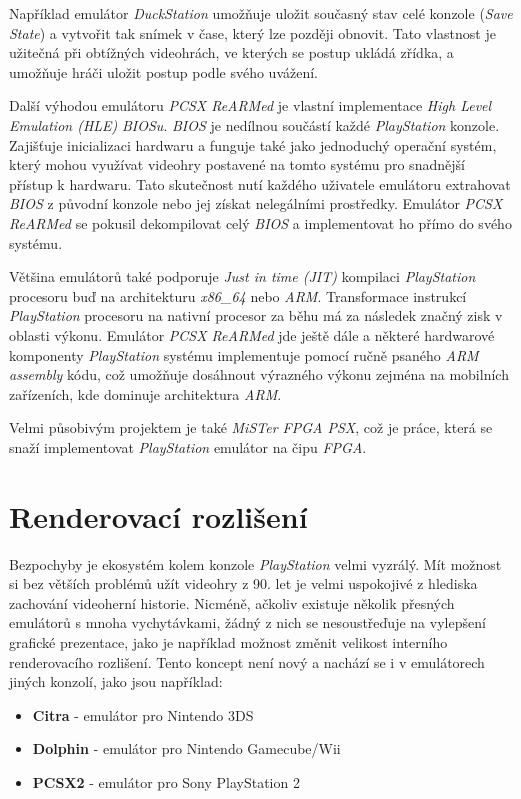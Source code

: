 Například emulátor \textit{DuckStation} umožňuje uložit současný stav celé konzole 
(\textit{Save State}) a vytvořit tak snímek v čase, který lze později obnovit. 
Tato vlastnost je užitečná při obtížných videohrách, ve kterých se postup ukládá 
zřídka, a umožňuje hráči uložit postup podle svého uvážení.

Další výhodou emulátoru \textit{PCSX ReARMed} je vlastní implementace \textit{High Level Emulation (HLE)} \textit{BIOSu}. 
\textit{BIOS} je nedílnou součástí každé \textit{PlayStation} konzole. 
Zajišťuje inicializaci hardwaru a funguje také jako jednoduchý operační systém, který mohou 
využívat videohry postavené na tomto systému pro snadnější přístup k hardwaru. 
Tato skutečnost nutí každého uživatele emulátoru extrahovat \textit{BIOS} z původní 
konzole nebo jej získat nelegálními prostředky. Emulátor \textit{PCSX ReARMed} se pokusil 
dekompilovat celý \textit{BIOS} a implementovat ho přímo do svého systému.

Většina emulátorů také podporuje \textit{Just in time (JIT)} kompilaci \textit{PlayStation} procesoru 
buď na architekturu \textit{x86_64} nebo \textit{ARM}. Transformace instrukcí \textit{PlayStation} 
procesoru na nativní procesor za běhu má za následek značný zisk v oblasti výkonu. 
Emulátor \textit{PCSX ReARMed} jde ještě dále a některé hardwarové komponenty \textit{PlayStation} systému 
implementuje pomocí ručně psaného \textit{ARM assembly} kódu, což umožňuje dosáhnout výrazného 
výkonu zejména na mobilních zařízeních, kde dominuje architektura \textit{ARM}.

Velmi působivým projektem je také \textit{MiSTer FPGA PSX}, což je práce, která se snaží implementovat \textit{PlayStation} emulátor na čipu \textit{FPGA}.

\section{Renderovací rozlišení}

Bezpochyby je ekosystém kolem konzole \textit{PlayStation} velmi vyzrálý. 
Mít možnost si bez větších problémů užít videohry z 90. let je velmi uspokojivé z hlediska 
zachování videoherní historie. Nicméně, ačkoliv existuje několik přesných emulátorů s mnoha vychytávkami, 
žádný z nich se nesoustřeďuje na vylepšení grafické prezentace, jako je například možnost změnit velikost interního renderovacího rozlišení.
Tento koncept není nový a nachází se i v emulátorech jiných konzolí, jako jsou například:

\begin{itemize}
\item{\textbf{Citra} - emulátor pro Nintendo 3DS}
\item{\textbf{Dolphin} - emulátor pro Nintendo Gamecube/Wii}
\item{\textbf{PCSX2} - emulátor pro Sony PlayStation 2}
\end{itemize}

